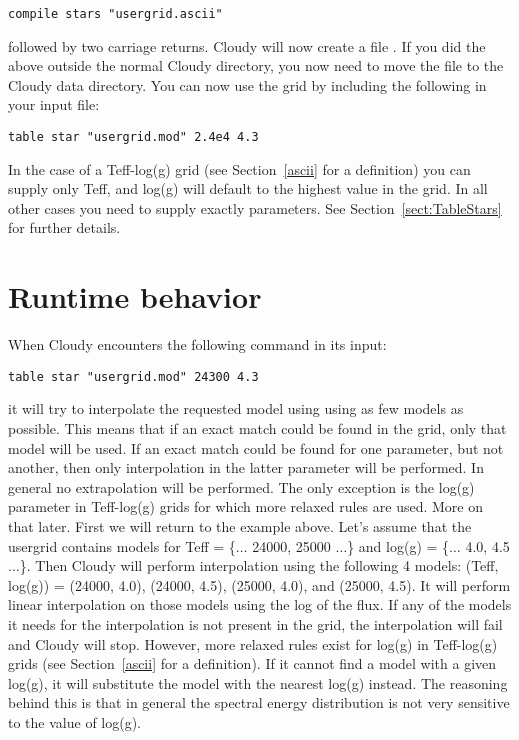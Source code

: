 \begin{verbatim}
compile stars "usergrid.ascii"
\end{verbatim}

\noindent
followed by two carriage returns. Cloudy will now create a file
. If you did the above outside the normal Cloudy
directory, you now need to move the  file to the
Cloudy data directory. You can now use the grid by including the following in
your input file:

\begin{verbatim}
table star "usergrid.mod" 2.4e4 4.3
\end{verbatim}

In the case of a Teff-log(g) grid (see Section~\ref{ascii} for a definition)
you can supply only Teff, and log(g) will default to the highest value in the
grid. In all other cases you need to supply exactly 
parameters. See Section~\ref{sect:TableStars} for further details.

\section{Runtime behavior}
\label{runtime}

When Cloudy encounters the following command in its input:

\begin{verbatim}
table star "usergrid.mod" 24300 4.3
\end{verbatim}

\noindent
it will try to interpolate the requested model using using as few models as
possible. This means that if an exact match could be found in the grid, only
that model will be used. If an exact match could be found for one parameter,
but not another, then only interpolation in the latter parameter will be
performed. In general no extrapolation will be performed. The only exception
is the log(g) parameter in Teff-log(g) grids for which more relaxed rules are
used. More on that later. First we will return to the example above. Let's
assume that the usergrid contains models for Teff = \{$\ldots$ 24000, 25000
$\ldots$\} and log(g) = \{$\ldots$ 4.0, 4.5 $\ldots$\}. Then Cloudy will
perform interpolation using the following 4 models: (Teff, log(g)) = (24000,
4.0), (24000, 4.5), (25000, 4.0), and (25000, 4.5). It will perform linear
interpolation on those models using the log of the flux. If any of the models
it needs for the interpolation is not present in the grid, the interpolation
will fail and Cloudy will stop. However, more relaxed rules exist for log(g)
in Teff-log(g) grids (see Section~\ref{ascii} for a definition). If it cannot
find a model with a given log(g), it will substitute the model with the
nearest log(g) instead. The reasoning behind this is that in general the
spectral energy distribution is not very sensitive to the value of log(g).
